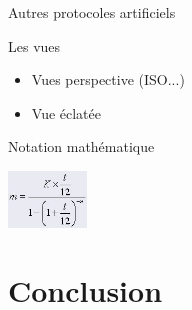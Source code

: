 \documentclass{beamer}
\begin{document}
\begin{frame}  
  { \Huge Autres protocoles artificiels }
  \begin{block}{Les vues}
  \begin{itemize}
  \item Vues perspective (ISO...) %
  \item Vue éclatée
  \end{itemize}
  \end{block}
  \begin{block}{Notation mathématique}
  \begin{center}
  \includegraphics[height=1.5cm]{./include/formule.jpg}
  \end{center}
  \end{block}
\end{frame}

\section{Conclusion}
\end{document}
